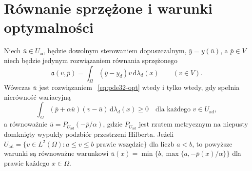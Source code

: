 \section{Równanie sprzężone i warunki optymalności}
\begin{twierdzenie}
\label{thm:pde32-adjoint}
Niech $\bar u\in U_{\mathrm{ad}}$ będzie dowolnym
sterowaniem dopuszczalnym, $\bar y=y(\bar u)$,
a $\bar p\in V$ niech będzie jedynym rozwiązaniem
równania sprzężonego
\begin{equation}\label{eq:pde32-adj}
 \mathfrak a(v,\bar p)
 =\int_\Omega(\bar y-y_d)v\,\mathrm d\lambda_d(x)
 \qquad(v\in V).
\end{equation}
Wówczas $\bar u$ jest rozwiązaniem
~\eqref{eq:pde32-opt} wtedy i tylko wtedy, gdy
spełnia nierówność wariacyjną
\begin{equation}\label{eq:pde32-variational-control}
 \int_\Omega(\bar p+\alpha\bar u)(v-\bar u)
 \,\mathrm d\lambda_d(x)\ge0
 \quad\text{dla każdego }v\in U_{\mathrm{ad}},
\end{equation}
a równoważnie
$\bar u=P_{U_{\mathrm{ad}}}(-\bar p/\alpha)$,
gdzie $P_{U_{\mathrm{ad}}}$ jest rzutem metrycznym na
niepusty domknięty wypukły podzbiór przestrzeni Hilberta.
Jeżeli $U_{\mathrm{ad}}=\{v\in L^2(\Omega):a\le v\le b
\text{ prawie wszędzie}\}$ dla liczb $a<b$,
to powyższe warunki są równoważne warunkowi
$\bar u(x)=\min\{b,\max\{a,-\bar p(x)/\alpha\}\}$
dla prawie każdego $x\in\Omega$.
\end{twierdzenie}
